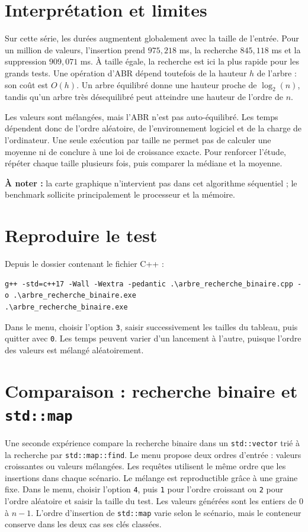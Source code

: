 \documentclass[10pt,a4paper]{article}
\begin{document}
\section{Interprétation et limites}
Sur cette série, les durées augmentent globalement avec la taille de l'entrée.
Pour un million de valeurs, l'insertion prend $975,218$ ms, la recherche
$845,118$ ms et la suppression $909,071$ ms. À taille égale, la recherche
est ici la plus rapide pour les grands tests. Une opération d'ABR dépend
toutefois de la hauteur $h$ de l'arbre : son coût est $O(h)$. Un arbre
équilibré donne une hauteur proche de $\log_2(n)$, tandis qu'un arbre très
désequilibré peut atteindre une hauteur de l'ordre de $n$.

Les valeurs sont mélangées, mais l'ABR n'est pas auto-équilibré. Les temps
dépendent donc de l'ordre aléatoire, de l'environnement logiciel et de la
charge de l'ordinateur. Une seule exécution par taille ne permet pas de
calculer une moyenne ni de conclure à une loi de croissance exacte. Pour
renforcer l'étude, répéter chaque taille plusieurs fois, puis comparer la
médiane et la moyenne.

\textbf{\color{bleu}À noter :} la carte graphique n'intervient pas dans cet
algorithme séquentiel ; le benchmark sollicite principalement le processeur
et la mémoire.

\section{Reproduire le test}
Depuis le dossier contenant le fichier C++ :
\begin{lstlisting}[numbers=none]
g++ -std=c++17 -Wall -Wextra -pedantic .\arbre_recherche_binaire.cpp -o .\arbre_recherche_binaire.exe
.\arbre_recherche_binaire.exe
\end{lstlisting}
Dans le menu, choisir l'option \texttt{3}, saisir successivement les tailles
du tableau, puis quitter avec \texttt{0}. Les temps peuvent varier d'un
lancement à l'autre, puisque l'ordre des valeurs est mélangé aléatoirement.

\newpage
\section{Comparaison : recherche binaire et \texttt{std::map}}
Une seconde expérience compare la recherche binaire dans un
\texttt{std::vector} trié à la recherche par \texttt{std::map::find}.
Le menu propose deux ordres d'entrée : valeurs croissantes ou valeurs
mélangées. Les requêtes utilisent le même ordre que les insertions dans
chaque scénario. Le mélange est reproductible grâce à une graine fixe.
Dans le menu, choisir l'option \texttt{4}, puis \texttt{1} pour l'ordre
croissant ou \texttt{2} pour l'ordre aléatoire et saisir la taille du test.
Les valeurs générées sont les entiers de $0$ à $n-1$. L'ordre d'insertion
de \texttt{std::map} varie selon le scénario, mais le conteneur conserve
dans les deux cas ses clés classées.
\end{document}
